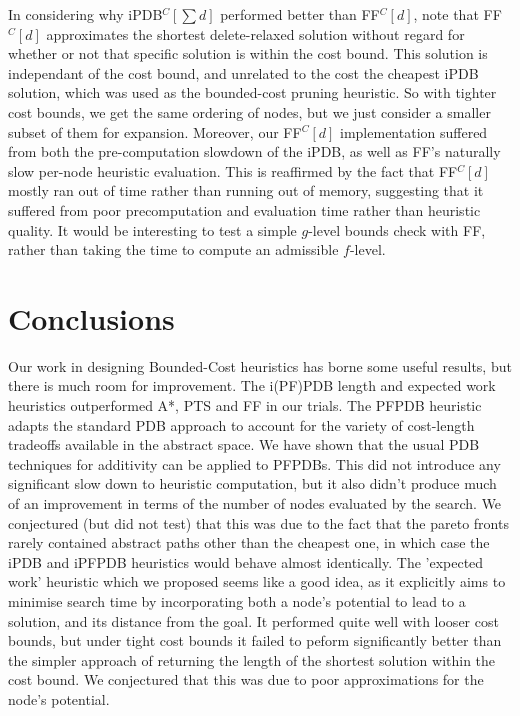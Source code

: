 \documentclass[letterpaper]{article} %
\begin{document}
In considering why iPDB\(^C[\sum d]\) performed better than FF\(^C[d]\),
note that FF\(^C[d]\) approximates the shortest
delete-relaxed solution without regard for whether or not
that specific solution is within the cost bound.
This solution is independant of the cost bound, and unrelated
to the cost the cheapest iPDB solution, which was used as the bounded-cost pruning heuristic.
So with tighter cost bounds, we get the same ordering of nodes,
but we just consider a smaller subset of them for expansion.
Moreover, our FF\(^C[d]\) implementation suffered from both the
pre-computation slowdown of the iPDB, as well as FF's naturally slow per-node heuristic evaluation.
This is reaffirmed by the fact that FF\(^C[d]\) mostly ran out of time
rather than running out of memory, suggesting that it suffered from
poor precomputation and evaluation time rather than heuristic quality.
It would be interesting to test a simple \(g\)-level bounds check with FF,
rather than taking the time to compute an admissible \(f\)-level.

\section{Conclusions}
Our work in designing Bounded-Cost heuristics has borne some useful results,
but there is much room for improvement.
The i(PF)PDB length and expected work heuristics outperformed A*, PTS and FF in our trials.
The PFPDB heuristic adapts the standard PDB approach to account for the variety
of cost-length tradeoffs available in the abstract space. We have shown
that the usual PDB techniques for additivity can be applied to PFPDBs.
This did not introduce any significant slow down to heuristic computation,
but it also didn't produce much of an improvement in terms of the number of
nodes evaluated by the search.
We conjectured (but did not test) that this was due to the fact that the
pareto fronts rarely contained abstract paths other than the cheapest one,
in which case the iPDB and iPFPDB heuristics would behave almost identically.
The 'expected work' heuristic which we proposed seems like a good idea,
as it explicitly aims to minimise search time by incorporating
both a node's potential to lead to a solution, and its distance from the goal.
It performed quite well with looser cost bounds, but
under tight cost bounds it failed to peform significantly better than the simpler approach of
returning the length of the shortest solution within the cost bound.
We conjectured that this was due to poor approximations for the node's
potential.
\end{document}
